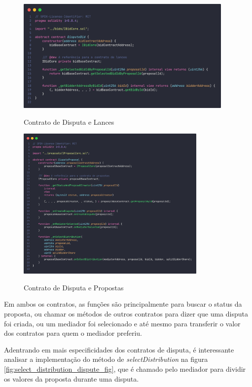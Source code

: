 \begin{figure}[!h]
  \centering
  \caption{Contrato de Disputa e Lances}
  \includegraphics[width=400px]{src/images/contracts/dispute_bid.png}
  \label{fig:dispute_bid_fig}
\end{figure}

\begin{figure}[!h]
  \centering
  \caption{Contrato de Disputa e Propostas}
  \includegraphics[width=350px]{src/images/contracts/dispute_proposal.png}
  \label{fig:dispute_proposal_fig}
\end{figure}

Em ambos os contratos, as funções são principalmente para buscar o status da proposta, ou chamar os métodos de outros contratos para dizer que uma disputa foi criada, ou um mediador foi selecionado e até mesmo para transferir o valor dos contratos para quem o mediador preferiu.

Adentrando em mais especificidades dos contratos de disputa, é interessante analisar a implementação do método de \textit{selectDistribution} na figura \ref{fig:select_distribution_dispute_fig}, que é chamado pelo mediador para dividir os valores da proposta durante uma disputa.

